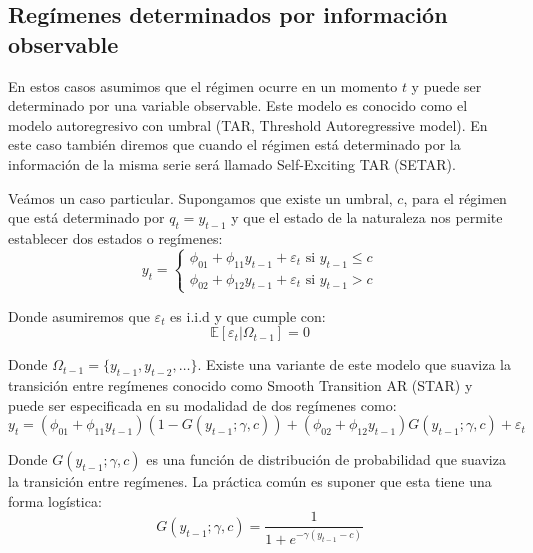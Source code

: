 \documentclass[
]{book}
\begin{document}
\hypertarget{reguxedmenes-determinados-por-informaciuxf3n-observable}{%
\subsection{Regímenes determinados por información observable}\label{reguxedmenes-determinados-por-informaciuxf3n-observable}}

En estos casos asumimos que el régimen ocurre en un momento \(t\) y puede ser determinado por una variable observable. Este modelo es conocido como el modelo autoregresivo con umbral (TAR, Threshold Autoregressive model). En este caso también diremos que cuando el régimen está determinado por la información de la misma serie será llamado Self-Exciting TAR (SETAR).

Veámos un caso particular. Supongamos que existe un umbral, \(c\), para el régimen que está determinado por \(q_t = y_{t-1}\) y que el estado de la naturaleza nos permite establecer dos estados o regímenes:
\begin{equation}
    y_t = 
    \begin{cases}
        \phi_{01} + \phi_{11} y_{t-1} + \varepsilon_t \text{ si } y_{t-1} \leq c \\
        \phi_{02} + \phi_{12} y_{t-1} + \varepsilon_t \text{ si } y_{t-1} > c 
    \end{cases}
\end{equation}

Donde asumiremos que \(\varepsilon_t\) es i.i.d y que cumple con:
\begin{equation*}
    \mathbb{E}[\varepsilon_t | \Omega_{t-1}] = 0
\end{equation*}

Donde \(\Omega_{t-1} = \{ y_{t-1}, y_{t-2}, \ldots \}\). Existe una variante de este modelo que suaviza la transición entre regímenes conocido como Smooth Transition AR (STAR) y puede ser especificada en su modalidad de dos regímenes como:
\begin{equation}
    y_t = (\phi_{01} + \phi_{11} y_{t-1}) (1 - G(y_{t-1}; \gamma, c)) + (\phi_{02} + \phi_{12} y_{t-1}) G(y_{t-1}; \gamma, c) + \varepsilon_t
\end{equation}

Donde \(G(y_{t-1}; \gamma, c)\) es una función de distribución de probabilidad que suaviza la transición entre regímenes. La práctica común es suponer que esta tiene una forma logística:
\begin{equation}
    G(y_{t-1}; \gamma, c) = \frac{1}{1 + e^{-\gamma (y_{t-1} - c)}}
\end{equation}
\end{document}
